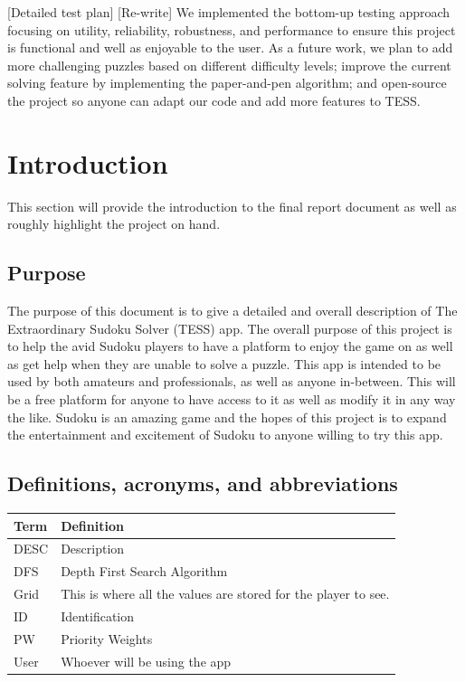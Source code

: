 \documentclass{article}
\begin{document}
[Detailed test plan] [Re-write] We implemented the bottom-up testing approach focusing on utility, reliability, robustness, and performance to ensure this project is functional and well as enjoyable to the user.  \newline \newline
\todo{[Conclusion] [Re-write]}
As a future work, we plan to add more challenging puzzles based on different difficulty levels; improve the current solving feature by implementing the paper-and-pen algorithm; and open-source the project so anyone can adapt our code and add more features to TESS. 

 
\section{Introduction}
 This section will provide the introduction to the final report document as well as roughly highlight the project on hand.
\subsection{Purpose}
The purpose of this document is to give a detailed and overall description of The Extraordinary Sudoku Solver (TESS) app. The overall purpose of this project is to help the avid Sudoku players to have a platform to enjoy the game on as well as get help when they are unable to solve a puzzle. This app is intended to be used by both amateurs and professionals, as well as anyone in-between. This will be a free platform for anyone to have access to it as well as modify it in any way the like. Sudoku is an amazing game and the hopes of this project is to expand the entertainment and excitement of Sudoku to anyone willing to try this app.

\subsection{Definitions, acronyms, and abbreviations}

\begin{tabular}{ | m{8em} | m{24em}|  } 
\hline
\textbf{Term}& \textbf{Definition}  \\ 
\hline
DESC & Description  \\ 
\hline
DFS & Depth First Search Algorithm\\
\hline
Grid & This is where all the values are stored for the player to see.  \\ 
\hline
ID & Identification  \\ 
\hline
PW & Priority Weights  \\ 
\hline
User & Whoever will be using the app  \\ 
\hline
\end{tabular}
\end{document}
